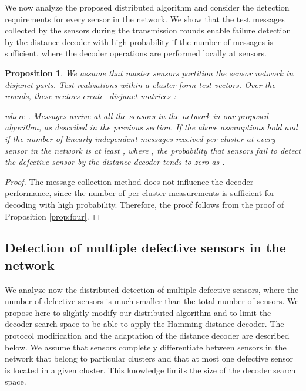 \documentclass[journal]{IEEEtran}
\newtheorem{prop}{Proposition}
\begin{document}
We now analyze the proposed distributed algorithm and consider the detection requirements for every sensor in the network. We show that the test messages collected by the sensors during the transmission rounds enable failure detection by the distance decoder with high probability if the number of messages is sufficient, where the decoder operations are performed locally at sensors.
\begin{prop}
We assume that  master sensors partition the sensor network in disjunct parts. Test realizations within a cluster form test vectors. Over the rounds, these vectors create -disjunct matrices : 
\vspace{-1mm}

where . Messages  arrive at all the sensors in the network in our proposed algorithm, as described in the previous section. If the above assumptions hold and if the number of linearly independent messages received per cluster at every sensor in the network is at least , where , the probability that sensors fail to detect the defective sensor by the distance decoder tends to zero as .
\label{th:mytheoremII}
\end{prop}
\begin{proof}
The message collection method does not influence the decoder performance, since the number of per-cluster measurements is sufficient for decoding with high probability. Therefore, the proof follows from the proof of Proposition \ref{prop:four}.
\end{proof}



\subsection{Detection of multiple defective sensors in the network}\label{sec:multipledef}
We analyze now the distributed detection of multiple defective sensors, where the number of defective sensors is much smaller than the total number of sensors. We propose here to slightly modify our distributed algorithm and to limit the decoder search space to be able to apply the Hamming distance decoder. The protocol modification and the adaptation of the distance decoder are described below. We assume that sensors completely differentiate between sensors in the network that belong to particular clusters and that at most one defective sensor is located in a given cluster. This knowledge limits the size of the decoder search space. 
\end{document}
